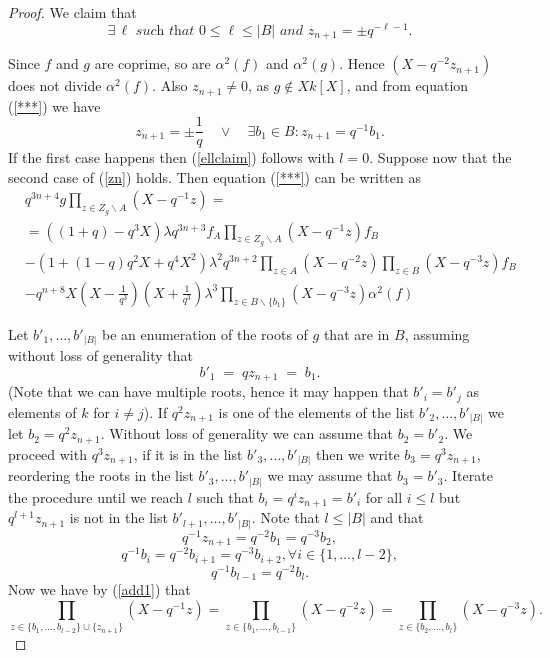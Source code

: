\documentclass[a4paper, 11pt]{article}
\theoremstyle{definition}
\begin{document}
\begin{proof}
\noindent We claim that 
\begin{equation}\label{ellclaim} \exists \, \ell \textit{ such that } 0\leq \ell \leq |B| \textit{ and } z_{n+1}=\pm q^{-\ell -1}.
\end{equation}

Since $f$ and $g$ are coprime, so are $\alpha^2(f)$ and $\alpha^2(g)$.  Hence $(X-q^{-2}z_{n+1})$ does not divide $\alpha^2(f)$. Also $z_{n+1}\neq 0$, as $g\notin Xk[X]$,  and from equation (\ref{***}) we have
\begin{equation}\label{zn}z_{n+1}=\pm \frac{1}{q}\quad \vee\quad \exists b_1\in B: z_{n+1}=q^{-1}b_1. \end{equation}
If the first case happens then (\ref{ellclaim}) follows with $l=0$. Suppose now that the second case of (\ref{zn}) holds. Then equation (\ref{***}) can be written as
\begin{equation}\label{simp_1}
\begin{split}
&q^{3n+4}g \prod_{z\in Z_g\backslash A}(X-q^{-1}z)=\\
&=\left((1+q)-q^3X\right)\lambda q^{3n+3}f_A\prod_{z\in Z_g\backslash A}(X-q^{-1}z)f_B\\
&-\left(1+(1-q)q^2X+q^4X^2\right)\lambda^2q^{3n+2}\prod_{z\in A}(X-q^{-2}z)\prod_{z\in B}(X-q^{-3}z)f_B\\
&-q^{n+8}X(X-\frac{1}{q^3})(X+\frac{1}{q^3})\lambda^3\prod_{z\in B\backslash\{b_1\}}(X-q^{-3}z)\alpha^2(f)
\end{split}
\end{equation}

Let $b'_1,\ldots,b'_{|B|}$ be an enumeration of the roots of $g$ that are in $B$, assuming without loss of generality that 
\begin{equation}\label{add1} b'_1 \; = \; qz_{n+1} \;= \; b_1.
\end{equation}
(Note that we can have multiple roots, hence it may happen that $b'_i=b'_j$ as elements of $k$ for $i\neq j$). If $q^2z_{n+1}$ is one of the elements of the list $b'_2,\ldots, b'_{|B|}$ we let $b_2=q^2z_{n+1}$. Without loss of generality we can assume that $b_2=b'_2$. We proceed with $q^3z_{n+1}$, if it is in the list $b'_3,\ldots,b'_{|B|}$ then we write $b_3=q^3z_{n+1}$, reordering the roots in the list $b'_3,\ldots,b'_{|B|}$ we may assume that $b_3=b'_3$. Iterate the procedure until we reach $l$ such that $b_i=q^{i}z_{n+1}=b'_i$ for all $i\leq l$ but $q^{l+1}z_{n+1}$ is not in the list $b'_{l+1},\ldots, b'_{|B|}$. Note that $l\leq |B|$ and that
$$q^{-1}z_{n+1}=q^{-2}b_1=q^{-3}b_2,$$
$$ q^{-1}b_i=q^{-2}b_{i+1}=q^{-3}b_{i+2}, \forall i\in\{1,\ldots, l-2\},$$
$$q^{-1}b_{l-1}=q^{-2}b_l.$$
Now we have by (\ref{add1}) that
$$\prod_{z\in\{b_1,\ldots,b_{l-2}\}\cup\{z_{n+1}\}}(X-q^{-1}z)=\prod_{z\in\{b_1,\ldots,b_{l-1}\}}(X-q^{-2}z)=\prod_{z\in\{b_2,\ldots,b_{l}\}}(X-q^{-3}z).$$


\end{proof}
\end{document}
